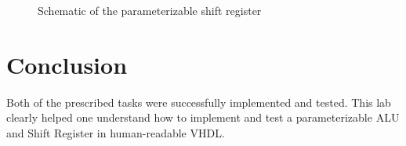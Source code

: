\documentclass[10pt]{article}
\begin{document}
\begin{figure}[h!t]
    \centering
    \caption{Schematic of the parameterizable shift register}
    \label{fig:schematic_B}
\end{figure}


\newpage

\section{Conclusion}
Both of the prescribed tasks were successfully implemented and tested. This lab clearly helped one understand how to implement and test a parameterizable ALU and Shift Register in human-readable VHDL. 
\newpage
\end{document}
